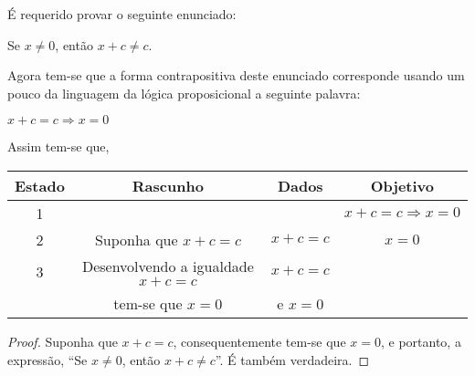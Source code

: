 \begin{exem}\label{exe:DemonstracaoImplicacao4}
	É requerido provar o seguinte enunciado:
	\begin{center}
		Se $x \neq 0$, então $x + c \neq c$.
	\end{center}
	Agora tem-se que a forma contrapositiva deste enunciado corresponde  usando um pouco da linguagem da lógica proposicional a seguinte palavra:
	\begin{center}
		$x + c = c \Rightarrow x = 0$
	\end{center}
	Assim tem-se que,
	\begin{table*}[h]
		\centering
		\begin{tabular}{c|c|c|c}
			\hline
			\rowcolor{cinzaClaro}
			Estado & Rascunho & Dados & Objetivo\\
			\hline
			1 & & & $x + c = c \Rightarrow x = 0$\\
			2 & Suponha que $x + c = c$ & $x + c = c$ & $x = 0$\\
			3 & Desenvolvendo a igualdade $x + c = c$  & $x + c = c$ & \\
			& tem-se que $x = 0$ & e $x = 0$ & \\
			\hline
		\end{tabular}
	\end{table*}
	
	\begin{proof}
		Suponha que $x + c = c$, consequentemente tem-se que $x = 0$, e portanto, a expressão, ``Se $x \neq 0$, então $x + c \neq c$''. É também verdadeira.
	\end{proof}
\end{exem}

